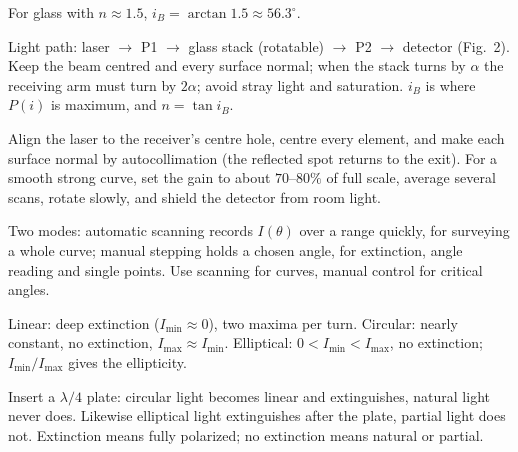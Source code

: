 \documentclass[11pt]{ctexart}
\begin{document}
For glass with $n\approx1.5$, $i_B=\arctan 1.5\approx56.3^\circ$.


Light path: laser $\to$ P1 $\to$ glass stack (rotatable) $\to$ P2 $\to$ detector (Fig.~2). Keep the beam centred and every surface normal; when the stack turns by $\alpha$ the receiving arm must turn by $2\alpha$; avoid stray light and saturation. $i_B$ is where $P(i)$ is maximum, and $n=\tan i_B$.


Align the laser to the receiver's centre hole, centre every element, and make each surface normal by autocollimation (the reflected spot returns to the exit). For a smooth strong curve, set the gain to about $70$--$80\%$ of full scale, average several scans, rotate slowly, and shield the detector from room light.



Two modes: automatic scanning records $I(\theta)$ over a range quickly, for surveying a whole curve; manual stepping holds a chosen angle, for extinction, angle reading and single points. Use scanning for curves, manual control for critical angles.


Linear: deep extinction ($I_{\min}\approx0$), two maxima per turn. Circular: nearly constant, no extinction, $I_{\max}\approx I_{\min}$. Elliptical: $0<I_{\min}<I_{\max}$, no extinction; $I_{\min}/I_{\max}$ gives the ellipticity.


Insert a $\lambda/4$ plate: circular light becomes linear and extinguishes, natural light never does. Likewise elliptical light extinguishes after the plate, partial light does not. Extinction means fully polarized; no extinction means natural or partial.

\end{document}
